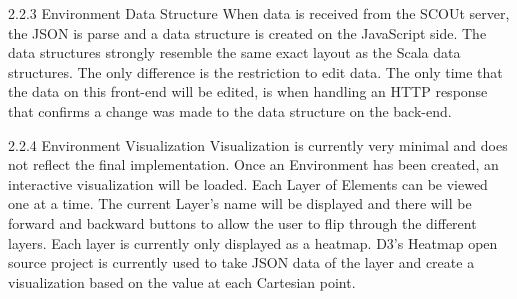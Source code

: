 2.2.3 Environment Data Structure
When data is received from the SCOUt server, the JSON is parse and a data structure is created on the JavaScript side.
The data structures strongly resemble the same exact layout as the Scala data structures.
The only difference is the restriction to edit data. The only time that the data on this front-end will be edited, is when handling an HTTP response that confirms a change was made to the data structure on the back-end.

2.2.4 Environment Visualization
Visualization is currently very minimal and does not reflect the final implementation.
Once an Environment has been created, an interactive visualization will be loaded.
Each Layer of Elements can be viewed one at a time.
The current Layer’s name will be displayed and there will be forward and backward buttons to allow the user to flip through the different layers.
Each layer is currently only displayed as a heatmap.
D3’s Heatmap open source project is currently used to take JSON data of the layer and create a visualization based on the value at each Cartesian point.


